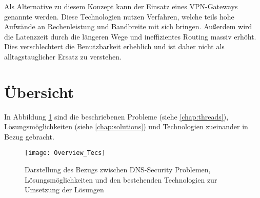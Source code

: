 Als Alternative zu diesem Konzept kann der Einsatz eines VPN-Gateways genannte werden. Diese Technologien nutzen Verfahren, welche teils hohe Aufwände an Rechenleistung und Bandbreite mit sich bringen. Außerdem wird die Latenzzeit durch die längeren Wege und ineffizientes Routing massiv erhöht. Dies verschlechtert die Benutzbarkeit erheblich und ist daher nicht als alltagstauglicher Ersatz zu verstehen.      

\section{Übersicht}
In Abbildung \ref{img:technologies-summary} sind die beschriebenen Probleme (siehe \ref{chap:threads}), Lösungsmöglichkeiten (siehe \ref{chap:solutions}) und Technologien zueinander in Bezug gebracht.

\begin{figure}[!hb]
    \centering
    \texttt{[image: Overview\_Tecs]}
    \caption{Darstellung des Bezugs zwischen DNS-Security Problemen, Lösungsmöglichkeiten und den bestehenden Technologien zur Umsetzung der Lösungen}
    \label{img:technologies-summary}
\end{figure}